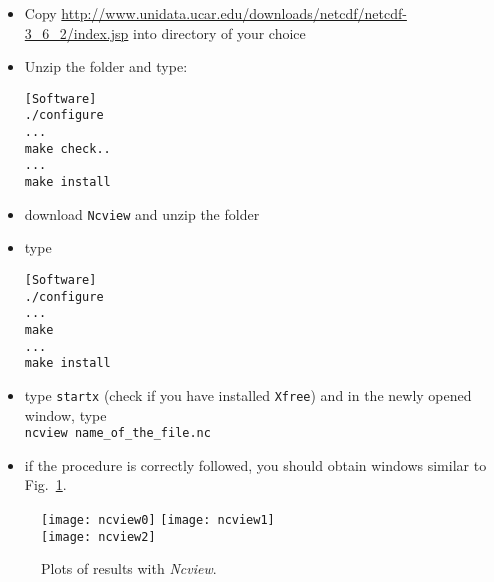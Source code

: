 \begin{itemize}
\item Copy \url{http://www.unidata.ucar.edu/downloads/netcdf/netcdf-3_6_2/index.jsp}  into directory of your choice
\item Unzip the folder  and type:
\begin{lstlisting}[style=Bash]
[Software]
./configure
...
make check..
...
make install
\end{lstlisting}

\item download \texttt{Ncview} and unzip the folder
\item type\\ 
\begin{lstlisting}[style=Bash]
[Software]
./configure
...
make 
...
make install
\end{lstlisting}

\item type \texttt{startx} (check if you have installed \texttt{Xfree}) and in the newly opened window, type\\
\texttt{ncview name\_of\_the\_file.nc}

\item if the procedure is correctly followed, you should obtain windows similar to Fig.~\ref{fig:ncview}.
\end{itemize}

\begin{figure}[htpb]
\centering
\texttt{[image: ncview0]}\hspace{.5cm} \texttt{[image: ncview1]} \\
\vspace{.5cm}
\texttt{[image: ncview2]} \caption{Plots of results with \textsl{Ncview}.\label{fig:ncview}}
\end{figure}
